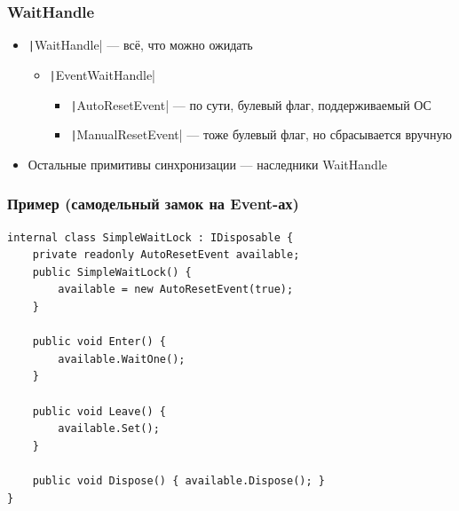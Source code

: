 \documentclass[xetex,mathserif,serif]{beamer}
\begin{document}
    \begin{frame}
        \frametitle{WaitHandle}
        \begin{itemize}
            \item \texttt|WaitHandle| --- всё, что можно ожидать
            \begin{itemize}
                \item \texttt|EventWaitHandle|
                \begin{itemize}
                    \item \texttt|AutoResetEvent| --- по сути, булевый флаг, поддерживаемый ОС
                    \item \texttt|ManualResetEvent| --- тоже булевый флаг, но сбрасывается вручную
                \end{itemize}
            \end{itemize}
            \item Остальные примитивы синхронизации --- наследники WaitHandle
        \end{itemize}
    \end{frame}

    \begin{frame}[fragile]
        \frametitle{Пример (самодельный замок на Event-ах)}
        \begin{small}
            \begin{verbatim}
internal class SimpleWaitLock : IDisposable {
    private readonly AutoResetEvent available;
    public SimpleWaitLock() {
        available = new AutoResetEvent(true); 
    }

    public void Enter() {
        available.WaitOne();
    }

    public void Leave() {
        available.Set();
    }

    public void Dispose() { available.Dispose(); }
}
            \end{verbatim}
        \end{small}
    \end{frame}
\end{document}
